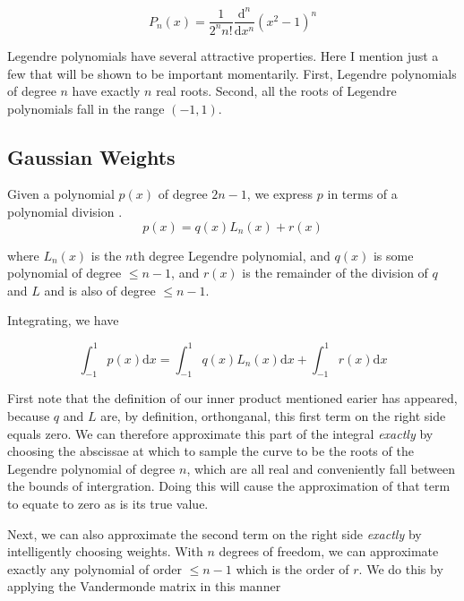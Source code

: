 \[  P_n(x) = \frac{1}{2^n n!} \frac{\mathrm{d}^n}{\mathrm{d}x^n} \left(x^2 - 1 \right) ^n  \]

Legendre polynomials have several attractive properties. Here I mention just a few that will be shown to be important momentarily.  First, Legendre polynomials of degree $n$ have exactly $n$ real roots. Second, all the roots of Legendre polynomials fall in the range $(-1,1)$. 

\subsection{Gaussian Weights}

Given a polynomial $p(x)$ of degree $2n-1$, we express $p$ in terms of a polynomial division
.
\[ p(x) = q(x) L_n(x) + r(x) \]

where $L_n(x)$ is the $n$th degree Legendre polynomial, and $q(x)$ is some polynomial of degree $\leq n-1$, and $r(x)$ is the remainder of the division of $q$ and $L$ and is also of degree $\leq n-1$.

Integrating, we have

\[ \int_{-1}^{1} p(x) \mathrm{d}x = \int_{-1}^{1} q(x) L_n(x) \mathrm{d}x + \int_{-1}^{1} r(x) \mathrm{d}x \]

First note that the definition of our inner product mentioned earier has appeared, because $q$ and $L$ are, by definition, orthonganal, this first term on the right side equals zero.  We can therefore approximate this part of the integral \textit{exactly} by choosing the abscissae at which to sample the curve to be the roots of the Legendre polynomial of degree $n$, which are all real and conveniently fall between the bounds of intergration.  Doing this will cause the approximation of that term to equate to zero as is its true value.

Next, we can also approximate the second term on the right side \textit{exactly} by intelligently choosing weights.  With $n$ degrees of freedom, we can approximate exactly any polynomial of order $\leq n-1$ which is the order of $r$.  We do this by applying the Vandermonde matrix in this manner


